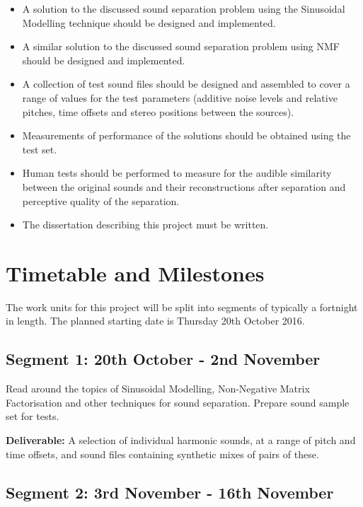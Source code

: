 \documentclass[12pt]{article}
\begin{document}
\begin{itemize}
\item A solution to the discussed sound separation problem using the Sinusoidal Modelling technique should be designed and implemented.

\item A similar solution to the discussed sound separation problem using NMF should be designed and implemented.

\item A collection of test sound files should be designed and assembled to cover a range of values for the test parameters (additive noise levels and relative pitches, time offsets and stereo positions between the sources).

\item Measurements of performance of the solutions should be obtained using the test set.

\item Human tests should be performed to measure for the audible similarity between the original sounds and their reconstructions after separation and perceptive quality of the separation.

\item The dissertation describing this project must be written.
\end{itemize}

\section*{Timetable and Milestones}

The work units for this project will be split into segments of typically a fortnight in length. The planned starting date is Thursday 20th October 2016.

\subsection*{Segment 1: 20th October - 2nd November}

Read around the topics of Sinusoidal Modelling, Non-Negative Matrix Factorisation and other techniques for sound separation. Prepare sound sample set for tests.

\textbf{Deliverable:} A selection of individual harmonic sounds, at a range of pitch and time offsets, and sound files containing synthetic mixes of pairs of these.

\subsection*{Segment 2: 3rd November - 16th November}
\end{document}
